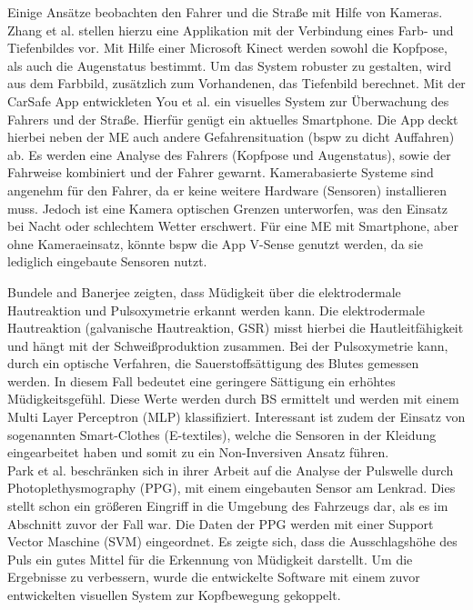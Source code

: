 {Einige Ansätze beobachten den Fahrer und die Straße mit Hilfe von Kameras. Zhang et al. \cite{Zhang:2015:RSD:2753829.2629482} stellen hierzu eine Applikation mit der Verbindung eines Farb- und Tiefenbildes vor. Mit Hilfe einer Microsoft Kinect werden sowohl die Kopfpose, als auch die Augenstatus bestimmt. Um das System robuster zu gestalten, wird aus dem Farbbild,  zusätzlich zum Vorhandenen, das Tiefenbild berechnet. Mit der CarSafe App entwickleten You et al. \cite{You:2013:CAA:2462456.2465428} ein visuelles System zur Überwachung des Fahrers und der Straße. Hierfür genügt ein aktuelles Smartphone. Die App deckt hierbei neben der \acl{ME} auch andere Gefahrensituation (\acl{bspw} zu dicht Auffahren) ab. Es werden eine Analyse des Fahrers (Kopfpose und Augenstatus), sowie der Fahrweise kombiniert und der Fahrer gewarnt. Kamerabasierte Systeme sind angenehm für den Fahrer, da er keine weitere Hardware (Sensoren) installieren muss. Jedoch ist eine Kamera optischen Grenzen unterworfen, was den Einsatz bei Nacht oder schlechtem Wetter erschwert. Für eine \acl{ME} mit Smartphone, aber ohne Kameraeinsatz, könnte \acl{bspw} die App V-Sense \cite{Chen:2015:ISV:2742647.2742659} genutzt werden, da sie lediglich  eingebaute Sensoren nutzt.

Bundele and Banerjee \citep{Bundele:2009:DFV:1806338.1806478} zeigten, dass Müdigkeit über die elektrodermale Hautreaktion und Pulsoxymetrie erkannt werden kann. Die elektrodermale Hautreaktion (galvanische Hautreaktion, GSR) misst hierbei die Hautleitfähigkeit und hängt mit der Schweißproduktion zusammen. Bei der Pulsoxymetrie kann, durch ein optische Verfahren, die Sauerstoffsättigung des Blutes gemessen werden. In diesem Fall bedeutet eine geringere Sättigung ein erhöhtes Müdigkeitsgefühl. Diese Werte werden durch \acl{BS} ermittelt und werden mit einem Multi Layer Perceptron (MLP) klassifiziert. Interessant ist zudem der Einsatz von sogenannten Smart-Clothes (E-textiles), welche die Sensoren in der Kleidung eingearbeitet haben und somit zu ein Non-Inversiven Ansatz führen.\\

Park et al. \cite{Park:2009:DDD:1667780.1667798} beschränken sich in ihrer Arbeit auf die Analyse der Pulswelle durch Photoplethysmography (PPG), mit einem eingebauten Sensor am Lenkrad. Dies stellt schon ein größeren Eingriff in die Umgebung des Fahrzeugs dar, als es im Abschnitt zuvor der Fall war. Die Daten der PPG werden mit einer Support Vector Maschine (SVM) eingeordnet. Es zeigte sich, dass die Ausschlagshöhe des Puls ein gutes Mittel für die Erkennung von Müdigkeit darstellt. Um die Ergebnisse zu verbessern, wurde die entwickelte Software mit einem zuvor entwickelten visuellen System zur Kopfbewegung gekoppelt. \\

}

